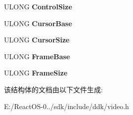 \begin{DoxyCompactItemize}
U\+L\+O\+NG {\bfseries Control\+Size}
\item 
\mbox{\label{struct___v_i_d_e_o___h_a_r_d_w_a_r_e___c_o_n_f_i_g_u_r_a_t_i_o_n___d_a_t_a_ab34b773a323c970dd4f1586b36a59a50}} 
U\+L\+O\+NG {\bfseries Cursor\+Base}
\item 
\mbox{\label{struct___v_i_d_e_o___h_a_r_d_w_a_r_e___c_o_n_f_i_g_u_r_a_t_i_o_n___d_a_t_a_a81463dcc2ea71a68c6f96c31ce108c85}} 
U\+L\+O\+NG {\bfseries Cursor\+Size}
\item 
\mbox{\label{struct___v_i_d_e_o___h_a_r_d_w_a_r_e___c_o_n_f_i_g_u_r_a_t_i_o_n___d_a_t_a_a1ffdd6d99ab29efd08bd0795df5d40a7}} 
U\+L\+O\+NG {\bfseries Frame\+Base}
\item 
\mbox{\label{struct___v_i_d_e_o___h_a_r_d_w_a_r_e___c_o_n_f_i_g_u_r_a_t_i_o_n___d_a_t_a_abae98ae7fc4bda87ddf4cbe9e00cd328}} 
U\+L\+O\+NG {\bfseries Frame\+Size}
\end{DoxyCompactItemize}


该结构体的文档由以下文件生成\+:\begin{DoxyCompactItemize}
\item 
E\+:/\+React\+O\+S-\/0../sdk/include/ddk/video.\+h\end{DoxyCompactItemize}
